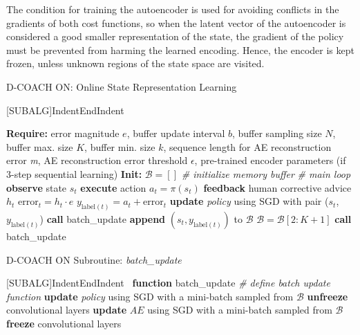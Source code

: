 The condition for training the autoencoder is used for avoiding conflicts in the gradients of both cost functions, so when the latent vector of the autoencoder is considered a good smaller representation of the state, the gradient of the policy must be prevented from harming the learned encoding. Hence, the encoder is kept frozen, unless unknown regions of the state space are visited. 

\begin{algorithm}[h]
\caption{D-COACH ON: Online State Representation Learning}\label{algorithm:EnDeepCOACH}
\begin{algorithmic}[1]
[SUBALG]{Indent}{EndIndent}{}{\algorithmicend\ }%

\State \textbf{Require:} error magnitude $\textit{e}$, buffer update interval $b$, buffer sampling size $N$, buffer max. size $K$, buffer min. size $k$, sequence length for AE reconstruction error \emph{m}, AE reconstruction error threshold $\epsilon$, pre-trained encoder parameters (if 3-step sequential learning) 
\State \textbf{Init:} $\mathcal{B} = []$ \emph{\# initialize memory buffer}
 \emph{\# main loop}
\State \textbf{observe} state $s_{t}$
\State \textbf{execute} action $a_{t}=\pi(s_{t})$
\State \textbf{feedback} human corrective advice $h_{t}$
\State $\mathrm{error}_{t} = h_{t}\cdot e$
\State $y_{\mathrm{label}(t)} = a_{t} + \mathrm{error}_{t}$ 
\State \textbf{update} \emph{policy} using SGD with pair ($s_{t}$, $y_{\mathrm{label}(t)}$) 
\State \textbf{call} batch\_update
\State \textbf{append} $(s_{t}, y_{\mathrm{label}(t)})$ to $\mathcal{B}$
\EndIf
{}
\State $\mathcal{B} = \mathcal{B}[2:K+1]$
\EndIf
{}
\State \textbf{call} batch\_update
\EndIf
\EndFor
\end{algorithmic}
\end{algorithm}

\begin{algorithm}[h]
\caption{D-COACH ON Subroutine: \emph{batch\_update}}\label{algorithm:batch_update}
\begin{algorithmic}[1]
[SUBALG]{Indent}{EndIndent}{}{\algorithmicend\ }%
\State \textbf{function} batch\_update \emph{\# define batch update function}
\Indent
{}
\State \textbf{update} \emph{policy} using SGD with a mini-batch sampled from $\mathcal{B}$
\State \textbf{unfreeze} convolutional layers
\State \textbf{update} $AE$ using SGD with a mini-batch sampled from $\mathcal{B}$
\Else
\State \textbf{freeze} convolutional layers
\EndIf
\EndIf
\EndIndent
\end{algorithmic}
\end{algorithm}

